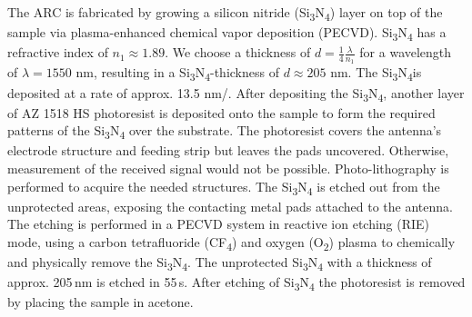 The ARC is fabricated by growing a silicon nitride (Si\textsubscript{3}N\textsubscript{4}) layer on top of the sample via plasma-enhanced chemical vapor deposition (PECVD). Si\textsubscript{3}N\textsubscript{4} has a refractive index of $n_1 \approx 1.89$. We choose a thickness of $d = \frac{1}{4} \frac{\lambda}{n_1}$ for a wavelength of $\lambda = 1550$ \si{\nano \meter}, resulting  in a Si\textsubscript{3}N\textsubscript{4}-thickness of $d \approx 205$ \si{\nano \meter}. The Si\textsubscript{3}N\textsubscript{4}is deposited at a rate of approx. \num{13.5} \si{\nano \meter/\min}. After depositing the Si\textsubscript{3}N\textsubscript{4}, another layer of AZ 1518 HS photoresist is deposited onto the sample to form the required patterns of the Si\textsubscript{3}N\textsubscript{4} over the substrate. The photoresist covers the antenna’s electrode structure and feeding strip but leaves the pads uncovered. Otherwise, measurement of the received signal would not be possible. Photo-lithography is performed to acquire the needed structures. The Si\textsubscript{3}N\textsubscript{4} is etched out from the unprotected areas, exposing the contacting metal pads attached to the antenna. The etching is performed in a PECVD system in reactive ion etching (RIE) mode, using a carbon tetrafluoride (CF\textsubscript{4}) and oxygen (O\textsubscript{2}) plasma to chemically and physically remove the Si\textsubscript{3}N\textsubscript{4}. The unprotected Si\textsubscript{3}N\textsubscript{4} with a thickness of approx. \num{205}\,\si{\nano \meter} is etched in \num{55}\,\si{\s}. After etching of Si\textsubscript{3}N\textsubscript{4} the photoresist is removed by placing the sample in acetone.

